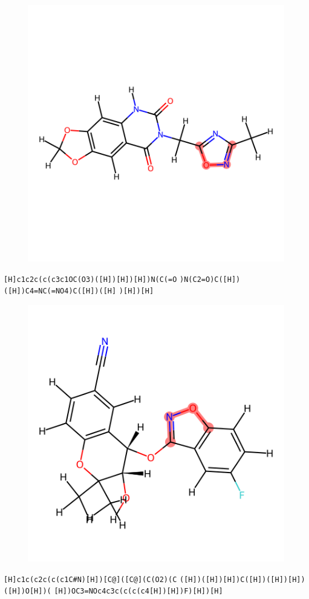 \documentclass{article}
\begin{document}
\begin{figure}[ht]
\centering
    \includegraphics{mol254.png}
\end{figure}
\verb|[H]c1c2c(c(c3c1OC(O3)([H])[H])[H])N(C(=O| \verb|)N(C2=O)C([H])([H])C4=NC(=NO4)C([H])([H]| \verb|)[H])[H]|

\begin{figure}[ht]
\centering
    \includegraphics{mol255.png}
\end{figure}
\verb|[H]c1c(c2c(c(c1C#N)[H])[C@]([C@](C(O2)(C| \verb|([H])([H])[H])C([H])([H])[H])([H])O[H])(| \verb|[H])OC3=NOc4c3c(c(c(c4[H])[H])F)[H])[H]|
\end{document}
